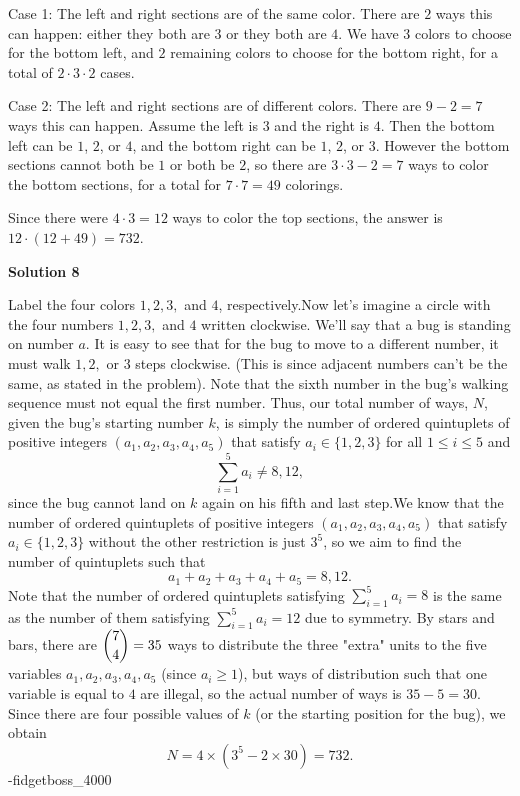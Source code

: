 \begin{enumerate}
 Case 1: The left and right sections are of the same color. There are $2$ ways this can happen: either they both are $3$ or they both are $4$. We have $3$ colors to choose for the bottom left, and $2$ remaining colors to choose for the bottom right, for a total of $2 \cdot 3 \cdot 2$ cases.

 Case 2: The left and right sections are of different colors. There are $9 - 2 = 7$ ways this can happen. Assume the left is $3$ and the right is $4$. Then the bottom left can be $1$, $2$, or $4$, and the bottom right can be $1$, $2$, or $3$. However the bottom sections cannot both be $1$ or both be $2$, so there are $3 \cdot 3 - 2 = 7$ ways to color the bottom sections, for a total for $7 \cdot 7 = 49$ colorings.

 Since there were $4 \cdot 3 = 12$ ways to color the top sections, the answer is $12 \cdot (12 + 49) = \boxed{732}$.

 



\textbf{Solution 8}

Label the four colors $1, 2, 3,$ and $4$, respectively.Now let's imagine a circle with the four numbers $1, 2, 3,$ and $4$ written clockwise. We'll say that a bug is standing on number $a$. It is easy to see that for the bug to move to a different number, it must walk $1, 2,$ or $3$ steps clockwise. (This is since adjacent numbers can't be the same, as stated in the problem). Note that the sixth number in the bug's walking sequence must not equal the first number. Thus, our total number of ways, $N$, given the bug's starting number $k$, is simply the number of ordered quintuplets of positive integers $(a_1, a_2, a_3, a_4, a_5)$ that satisfy $a_i \in \{1, 2, 3\}$ for all $1 \leq i \leq 5$ and
 \[\sum_{i=1}^{5} a_i \neq 8, 12,\]since the bug cannot land on $k$ again on his fifth and last step.We know that the number of ordered quintuplets of positive integers $(a_1, a_2, a_3, a_4, a_5)$ that satisfy $a_i \in \{1, 2, 3\}$ without the other restriction is just $3^5$, so we aim to find the number of quintuplets such that
 \[a_1 + a_2 + a_3 + a_4 + a_5 = 8, 12.\]Note that the number of ordered quintuplets satisfying $\sum_{i=1}^{5} a_i = 8$ is the same as the number of them satisfying $\sum_{i=1}^{5} a_i = 12$ due to symmetry. By stars and bars, there are $\dbinom{7}{4} = 35$ ways to distribute the three "extra" units to the five variables $a_1, a_2, a_3, a_4, a_5$ (since $a_i \geq 1$), but ways of distribution such that one variable is equal to $4$ are illegal, so the actual number of ways is $35 - 5 = 30$. Since there are four possible values of $k$ (or the starting position for the bug), we obtain
 \[N = 4 \times (3^5 - 2 \times 30) = \boxed{732}.\]-fidgetboss\_4000


\end{enumerate}

